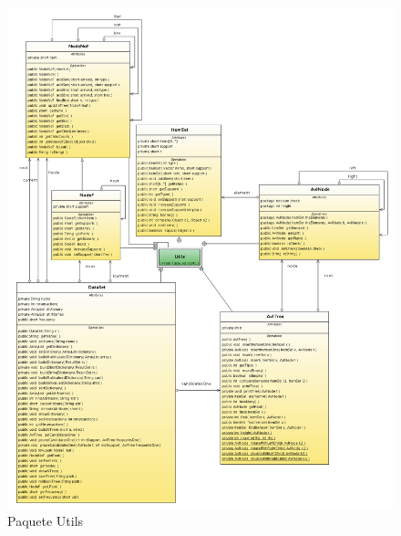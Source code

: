 \begin{figure}[ht]
\centering
\includegraphics[width=1.0\textwidth]{imgsClases/Utils.png}
\caption{Paquete Utils}
\end{figure}
\newpage
